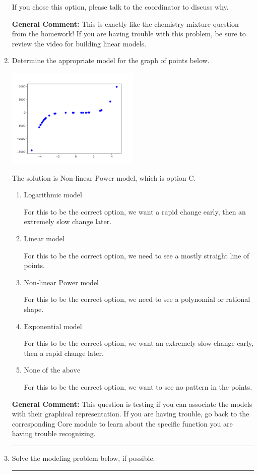 \documentclass{extbook}[14pt]
\newcommand{\litem}[1]{\item #1

\rule{\textwidth}{0.4pt}}
\begin{document}
\begin{enumerate}
{\begin{enumerate}[label=\Alph*.]
If you chose this option, please talk to the coordinator to discuss why.
\end{enumerate}

\textbf{General Comment:} This is exactly like the chemistry mixture question from the homework! If you are having trouble with this problem, be sure to review the video for building linear models.
}
\litem{
Determine the appropriate model for the graph of points below.

\begin{center}
    \includegraphics[width=0.5\textwidth]{../Figures/identifyModelGraph12B.png}
\end{center}


The solution is \( \text{Non-linear Power model} \), which is option C.\begin{enumerate}[label=\Alph*.]
\item \( \text{Logarithmic model} \)

For this to be the correct option, we want a rapid change early, then an extremely slow change later.
\item \( \text{Linear model} \)

For this to be the correct option, we need to see a mostly straight line of points.
\item \( \text{Non-linear Power model} \)

For this to be the correct option, we need to see a polynomial or rational shape.
\item \( \text{Exponential model} \)

For this to be the correct option, we want an extremely slow change early, then a rapid change later.
\item \( \text{None of the above} \)

For this to be the correct option, we want to see no pattern in the points.
\end{enumerate}

\textbf{General Comment:} This question is testing if you can associate the models with their graphical representation. If you are having trouble, go back to the corresponding Core module to learn about the specific function you are having trouble recognizing.
}
\litem{
Solve the modeling problem below, if possible.

}
\end{enumerate}
\end{document}
